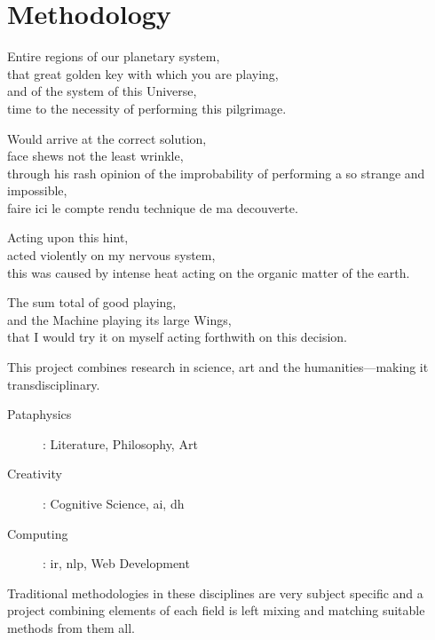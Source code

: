 
\chapter{Methodology}
\label{ch:methodology}

\startcontents[chapters]

\vfill

Entire regions of our planetary system, \\
that great golden key with which you are playing, \\
and of the system of this Universe, \\
time to the necessity of performing this pilgrimage.

Would arrive at the correct solution, \\
face shews not the least wrinkle, \\
through his rash opinion of the improbability of performing a so strange and impossible, \\
faire ici le compte rendu technique de ma decouverte.

Acting upon this hint, \\
acted violently on my nervous system, \\
this was caused by intense heat acting on the organic matter of the earth.

The sum total of good playing, \\
and the Machine playing its large Wings, \\
that I would try it on myself acting forthwith on this decision.

\newpage
\minicontents
\spirals


This project combines research in science, art and the humanities---making it transdisciplinary.

\begin{description}
  \item [Pataphysics]: Literature, Philosophy, Art
  \item [Creativity]: Cognitive Science, \gls{ai}, \gls{dh}
  \item [Computing]: \gls{ir}, \gls{nlp}, Web Development
\end{description}


Traditional methodologies in these disciplines are very subject specific and a project combining elements of each field is left mixing and matching suitable methods from them all.

